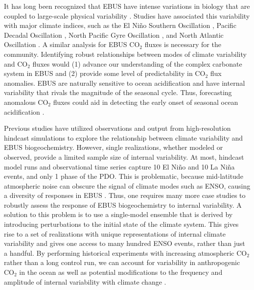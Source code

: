 \documentclass[hvmath, online,bgd]{copernicus_discussions}
\begin{document}
It has long been recognized that EBUS have intense variations in biology that are coupled to large-scale physical variability \citep[\textit{e.g.},][]{Chelton:1982, Barber:1983, Barber:1986}. Studies have associated this variability with major climate indices, such as the El Ni\~no Southern Oscillation \citep[ENSO;][]{Barber:1983,Barber:1986,Lynn:2002,Chavez:2002,Escribano:2004,Frischknecht:2015}, Pacific Decadal Oscillation \citep[PDO;][]{Mantua:1997, Chhak:2007, Chenillat:2012}, North Pacific Gyre Oscillation \citep[NPGO;][]{DiLorenzo:2008, DiLorenzo:2009, Chenillat:2012}, and North Atlantic Oscillation \citep[NAO;][]{Borges:2003,Cropper:2014}. A similar analysis for EBUS CO$_{2}$ fluxes is necessary for the community. Identifying robust relationships between modes of climate variability and CO$_{2}$ fluxes would (1) advance our understanding of the complex carbonate system in EBUS and (2) provide some level of predictability in CO$_{2}$ flux anomalies. EBUS are naturally sensitive to ocean acidification and  have internal variability that rivals the magnitude of the seasonal cycle. 
Thus, forecasting anomalous CO$_{2}$ fluxes could aid in detecting the early onset of seasonal ocean acidification \citep{Landschuetzer:2018,Kwiatkowski:2018,Hauck:2018}.

Previous studies have utilized observations \citep[\textit{e.g.},][]{Boyd:1987,Friederich:2002,Chavez:2002,Santana-Casiano:2007,DiLorenzo:2008,DiLorenzo:2009}  and output from high-resolution hindcast simulations \citep{Jacox:2015,Frischknecht:2015,Frischknecht:2017,Turi:2017,Mogollon:2017} to explore the relationship between climate variability and EBUS biogeochemistry. However, single realizations, whether modeled or observed, provide a limited sample size of internal variability. At most, hindcast model runs and observational time series capture 10 El Ni\~no and 10 La Ni\~na events, and only 1 phase of the PDO. This is problematic, because mid-latitude atmospheric noise can obscure the signal of climate modes such as ENSO, causing a diversity of responses in EBUS \citep{Deser:2017,Deser:2018}. Thus, one requires many more case studies to robustly assess the response of EBUS biogeochemistry to internal variability. A solution to this problem is to use a single-model ensemble that is derived by introducing perturbations to the initial state of the climate system. This gives rise to a set of realizations with unique representations of internal climate variability and gives one access to many hundred ENSO events, rather than just a handful. By performing historical experiments with increasing atmospheric CO$_{2}$ rather than a long control run, we can account for variability in anthropogenic CO$_{2}$ in the ocean as well as potential modifications to the frequency and amplitude of internal variability with climate change \citep[e.g.,][]{Timmermann:1999, Kuzmina:2005, Sydeman:2013, Cai:2014, Cai:2015}. 
\end{document}
